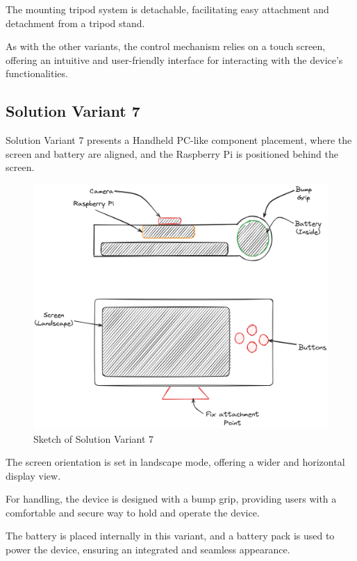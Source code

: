 The mounting tripod system is detachable, facilitating easy attachment and detachment from a tripod stand.

As with the other variants, the control mechanism relies on a touch screen, offering an intuitive and user-friendly interface for interacting with the device's functionalities.

\subsection{Solution Variant 7}

Solution Variant 7 presents a Handheld PC-like component placement, where the screen and battery are aligned, and the Raspberry Pi is positioned behind the screen.

\begin{figure}[ht!]
    \centering
    \includegraphics[width=\linewidth]{texs/Part1/chapter3/image/v7.png}
    \caption{Sketch of Solution Variant 7}
    \label{fig:sketch-solution-variant-7}
\end{figure}

The screen orientation is set in landscape mode, offering a wider and horizontal display view.

For handling, the device is designed with a bump grip, providing users with a comfortable and secure way to hold and operate the device.

The battery is placed internally in this variant, and a battery pack is used to power the device, ensuring an integrated and seamless appearance.

